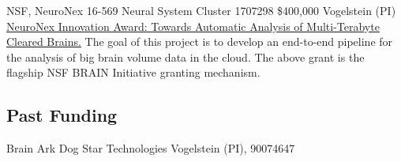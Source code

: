 \documentclass[10pt,colorlinks=true,urlcolor=blue]{moderncv}
\begin{document}
    {NSF, NeuroNex 16-569 Neural System Cluster 1707298}%
    {\$400,000}
    {Vogelstein (PI)}
    {\href{https://www.nsf.gov/awardsearch/showAward?AWD_ID=1707298}%
    {NeuroNex Innovation Award: Towards Automatic Analysis of Multi-Terabyte Cleared Brains.}%
    The goal of this project is to develop an end-to-end pipeline for the analysis of big brain volume data in the cloud. }
    {}
    {The above grant is the flagship NSF BRAIN Initiative granting mechanism.}

\subsection{Past Funding}

    {Brain Ark}
    {Dog Star Technologies}
    {}
    {Vogelstein (PI), 90074647}
    {}
\end{document}
